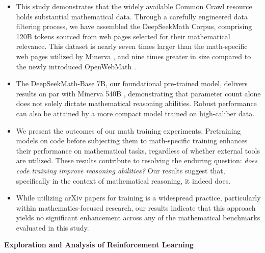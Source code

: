 \begin{itemize}[topsep=0pt]
    \item This study demonstrates that the widely available Common Crawl resource holds substantial mathematical data. Through a carefully engineered data filtering process, we have assembled the DeepSeekMath Corpus, comprising 120B tokens sourced from web pages selected for their mathematical relevance. This dataset is nearly seven times larger than the math-specific web pages utilized by Minerva \citep{minerva}, and nine times greater in size compared to the newly introduced OpenWebMath \citep{openwebmath}.

\item The DeepSeekMath-Base 7B, our foundational pre-trained model, delivers results on par with Minerva 540B \citep{minerva}, demonstrating that parameter count alone does not solely dictate mathematical reasoning abilities. Robust performance can also be attained by a more compact model trained on high-caliber data.

\item We present the outcomes of our math training experiments. Pretraining models on code before subjecting them to math-specific training enhances their performance on mathematical tasks, regardless of whether external tools are utilized. These results contribute to resolving the enduring question: \textit{does code training improve reasoning abilities?} Our results suggest that, specifically in the context of mathematical reasoning, it indeed does.

\item While utilizing arXiv papers for training is a widespread practice, particularly within mathematics-focused research, our results indicate that this approach yields no significant enhancement across any of the mathematical benchmarks evaluated in this study.
\end{itemize}

\textbf{Exploration and Analysis of Reinforcement Learning}

